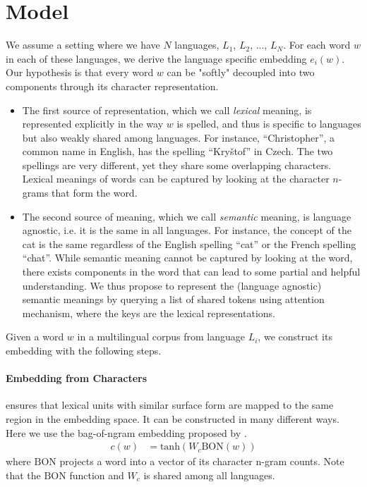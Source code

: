 \section{\label{sec:model}Model}
We assume a setting where we have $N$ languages, $L_1$, $L_2$, ..., $L_N$. For each word $w$ in each of these languages, we derive the language specific embedding $e_i(w)$. Our hypothesis is that every word $w$ can be "softly" decoupled into two components through its character representation.  
\begin{itemize}
  \item The first source of representation, which we call \textit{lexical} meaning, is represented explicitly in the way $w$ is spelled, and thus is specific to languages but also weakly shared among languages. For instance, ``Christopher'', a common name in English, has the spelling ``Kry\v{s}tof'' in Czech. The two spellings are very different, yet they share some overlapping characters. Lexical meanings of words can be captured by looking at the character $n$-grams that form the word.
  \item The second source of meaning, which we call \textit{semantic} meaning, is language agnostic, i.e. it is the same in all languages. For instance, the concept of the cat is the same regardless of the English spelling ``cat'' or the French spelling ``chat''. While semantic meaning cannot be captured by looking at the word, there exists components in the word that can lead to some partial and helpful understanding. We thus propose to represent the (language agnostic) semantic meanings by querying a list of shared tokens using attention mechanism, where the keys are the lexical representations.
\end{itemize}

Given a word $w$ in a multilingual corpus from language $L_i$, we construct its embedding with the following steps.

\paragraph{Embedding from Characters} ensures that lexical units with similar surface form are mapped to the same region in the embedding space. It can be constructed in many different ways. Here we use the bag-of-ngram embedding proposed by . 
\begin{align}
    c(w) &= \text{tanh}(W_c \text{BON}(w))
\end{align}
where $\text{BON}$ projects a word into a vector of its character n-gram counts. Note that the $\text{BON}$ function and $W_c$ is shared among all languages.

